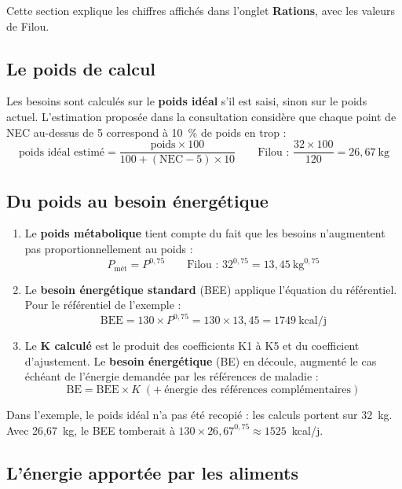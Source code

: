 \documentclass[11pt,a4paper]{article}
\newcommand{\ui}[1]{\textsf{\textbf{#1}}}
\begin{document}
Cette section explique les chiffres affichés dans l'onglet \ui{Rations}, avec les valeurs de
Filou.

\subsection{Le poids de calcul}

Les besoins sont calculés sur le \textbf{poids idéal} s'il est saisi, sinon sur le poids
actuel. L'estimation proposée dans la consultation considère que chaque point de NEC au-dessus
de 5 correspond à 10~\% de poids en trop :
\[
  \text{poids idéal estimé} = \frac{\text{poids} \times 100}{100 + (\text{NEC} - 5) \times 10}
  \qquad\text{Filou : } \frac{32 \times 100}{120} = 26{,}67\ \text{kg}
\]

\subsection{Du poids au besoin énergétique}

\begin{enumerate}
  \item Le \textbf{poids métabolique} tient compte du fait que les besoins n'augmentent pas
        proportionnellement au poids :
        \[ P_{\text{mét}} = P^{0{,}75} \qquad\text{Filou : } 32^{0{,}75} = 13{,}45\ \text{kg}^{0{,}75} \]
  \item Le \textbf{besoin énergétique standard} (BEE) applique l'équation du référentiel. Pour
        le référentiel de l'exemple :
        \[ \text{BEE} = 130 \times P^{0{,}75} = 130 \times 13{,}45 = 1749\ \text{kcal/j} \]
  \item Le \textbf{K calculé} est le produit des coefficients K1 à K5 et du coefficient
        d'ajustement. Le \textbf{besoin énergétique} (BE) en découle, augmenté le cas échéant de
        l'énergie demandée par les références de maladie :
        \[ \text{BE} = \text{BEE} \times K \;(+\ \text{énergie des références complémentaires}) \]
\end{enumerate}

\begin{aretenir}
Dans l'exemple, le poids idéal n'a pas été recopié : les calculs portent sur 32~kg. Avec
26,67~kg, le BEE tomberait à $130 \times 26{,}67^{0{,}75} \approx 1525$~kcal/j.
\end{aretenir}

\subsection{L'énergie apportée par les aliments}
\end{document}
